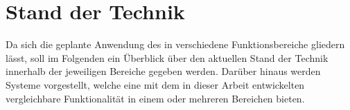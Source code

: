 \chapter{Stand der Technik}
\label{chap.tech}

Da sich die geplante Anwendung des  in verschiedene Funktionsbereiche gliedern lässt, soll im Folgenden ein Überblick über den aktuellen Stand der Technik innerhalb der jeweiligen Bereiche gegeben werden. Darüber hinaus werden Systeme vorgestellt, welche eine mit dem in dieser Arbeit entwickelten \kps{} vergleichbare Funktionalität in einem oder mehreren Bereichen bieten.

